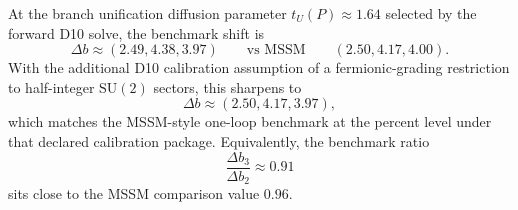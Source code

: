 At the branch unification diffusion parameter \(t_U(P)\approx 1.64\) selected by the forward D10
solve, the benchmark shift is
\[
\Delta b\approx (2.49,4.38,3.97)
\qquad
\text{vs MSSM}
\qquad
(2.50,4.17,4.00).
\]
With the additional D10 calibration assumption of a fermionic-grading restriction to
half-integer \(\mathrm{SU}(2)\) sectors, this sharpens to
\[
\Delta b\approx (2.50,4.17,3.97),
\]
which matches the MSSM-style one-loop benchmark at the percent level under that declared
calibration package. Equivalently, the benchmark ratio
\[
\frac{\Delta b_3}{\Delta b_2}\approx 0.91
\]
sits close to the MSSM comparison value \(0.96\).
